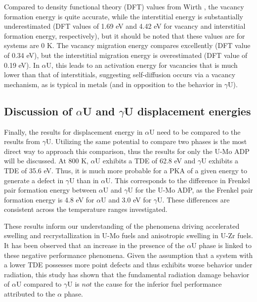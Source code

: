 \documentclass[review]{elsarticle}
\begin{document}
\FloatBarrier

Compared to density functional theory (DFT) values from Wirth \cite{wirth2011}, the vacancy formation energy is quite accurate, while the interstitial energy is substantially underestimated (DFT values of 1.69 eV and 4.42 eV for vacancy and interstitial formation energy, respectively), but it should be noted that these values are for systems are 0 K. The vacancy migration energy compares excellently (DFT value of 0.34 eV), but the interstitial migration energy is overestimated (DFT value of 0.19 eV). In $\alpha$U, this leads to an activation energy for vacancies that is much lower than that of interstitials, suggesting self-diffusion occurs via a vacancy mechanism, as is typical in metals (and in opposition to the behavior in $\gamma$U). 

\subsection{Discussion of $\alpha$U and $\gamma$U displacement energies}

Finally, the results for displacement energy in $\alpha$U need to be compared to the results from $\gamma$U. Utilizing the same potential to compare two phases is the most direct way to approach this comparison, thus the results for only the U-Mo ADP will be discussed. At 800 K, $\alpha$U exhibits a TDE of 62.8 eV and $\gamma$U exhibits a TDE of 35.6 eV. Thus, it is much more probable for a PKA of a given energy to generate a defect in $\gamma$U than in $\alpha$U. This corresponds to the difference in Frenkel pair formation energy between $\alpha$U and $\gamma$U for the U-Mo ADP, as the Frenkel pair formation energy is 4.8 eV for $\alpha$U and 3.0 eV for $\gamma$U. These differences are consistent across the temperature ranges investigated.

These results inform our understanding of the phenomena driving accelerated swelling and recrystallization in U-Mo fuels and anisotropic swelling in U-Zr fuels. It has been observed that an increase in the presence of the $\alpha$U phase is linked to these negative performance phenomena. Given the assumption that a system with a lower TDE possesses more point defects and thus exhibits worse behavior under radiation, this study has shown that the fundamental radiation damage behavior of $\alpha$U compared to $\gamma$U is $\textit{not}$ the cause for the inferior fuel performance attributed to the $\alpha$ phase.

\FloatBarrier
\end{document}
